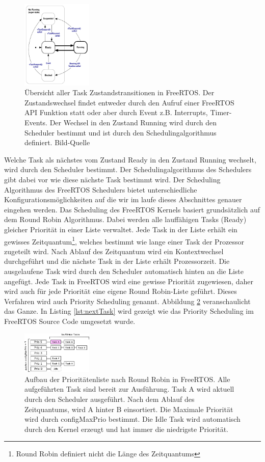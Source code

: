 \begin{figure}[ht!]
	\centering
		\includegraphics[width=0.3\textwidth]{Pictures/FreeRTOSOrg/taskStates.png}
	\caption{Übersicht aller Task Zustandstransitionen in FreeRTOS. Der Zustandswechsel findet entweder durch den Aufruf einer FreeRTOS API Funktion statt oder aber durch Event z.B. Interrupts, Timer-Events. Der Wechsel in den Zustand Running wird durch den Scheduler bestimmt und ist durch den Schedulingalgorithmus definiert.  Bild-Quelle~\protect{}}
	\label{fig:TaskStates}
\end{figure}Welche Task als näch\-stes vom Zustand Ready in den Zustand Running wechselt, wird durch den Scheduler bestimmt. Der Schedulingalgorithmus des Schedulers gibt dabei vor wie diese näch\-ste Task bestimmt wird. Der Scheduling Algorithmus des FreeRTOS Schedulers bietet unterschiedliche Kon\-fi\-gu\-ra\-tions\-mög\-lich\-kei\-ten auf die wir im laufe dieses Abschnittes genauer eingehen werden. Das Scheduling des FreeRTOS Kernels basiert grundsätzlich auf dem Round Robin Algorithmus\cite{9783827373427}. Dabei werden alle lauffähigen Tasks (Ready) gleicher Priorität in einer Liste verwaltet. Jede Task in der Liste erhält ein gewisses Zeitquantum\footnote{Round Robin definiert nicht die Länge des Zeitquantums}, welches bestimmt wie lange einer Task der Prozessor zugeteilt wird. Nach Ablauf des Zeitquantum wird ein Kontextwechsel durchgeführt und die näch\-ste Task in der Liste erhält Prozessorzeit. Die ausgelaufene Task wird durch den Scheduler automatisch hinten an die Liste angefügt. Jede Task in FreeRTOS wird eine gewisse Priorität zugewiesen, daher wird auch für jede Priorität eine eigene Round Robin-Liste geführt. Dieses Verfahren wird auch Priority Scheduling \cite{9783827373427} genannt. Abbildung \ref{fig:PrioList1} veranschaulicht das Ganze. In Listing \ref{lst:nextTask} wird gezeigt wie das Priority Scheduling im FreeRTOS Source Code umgesetzt wurde. 
\begin{figure}[ht!]
	\centering
		\includegraphics[width=0.3\textwidth]{Pictures/Scheduling/PrioList1.png}
	\caption{Aufbau der Prioritätenliste nach Round Robin in FreeRTOS. Alle aufgeführten Task sind bereit zur Ausführung. Task A wird aktuell durch den Scheduler ausgeführt. Nach dem Ablauf des Zeitquantums, wird A hinter B einsortiert. Die Maximale Priorität wird durch configMaxPrio bestimmt. Die Idle Task wird automatisch durch den Kernel erzeugt und hat immer die niedrigste Priorität. }
	\label{fig:PrioList1}
\end{figure}
